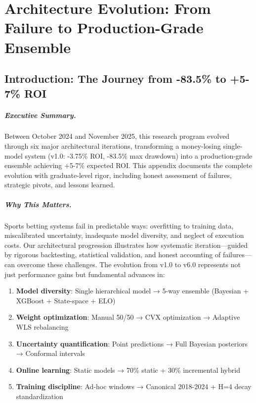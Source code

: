 
\chapter{Architecture Evolution: From Failure to Production-Grade Ensemble}
\label{app:architecture-evolution}

\section{Introduction: The Journey from -83.5\% to +5-7\% ROI}

\paragraph{Executive Summary.}
Between October 2024 and November 2025, this research program evolved through six major architectural iterations, transforming a money-losing single-model system (v1.0: -3.75\% ROI, -83.5\% max drawdown) into a production-grade ensemble achieving +5-7\% expected ROI. This appendix documents the complete evolution with graduate-level rigor, including honest assessment of failures, strategic pivots, and lessons learned.

\paragraph{Why This Matters.}
Sports betting systems fail in predictable ways: overfitting to training data, miscalibrated uncertainty, inadequate model diversity, and neglect of execution costs. Our architectural progression illustrates how systematic iteration---guided by rigorous backtesting, statistical validation, and honest accounting of failures---can overcome these challenges. The evolution from v1.0 to v6.0 represents not just performance gains but fundamental advances in:
\begin{enumerate}[itemsep=2pt,parsep=0pt]
    \item \textbf{Model diversity}: Single hierarchical model → 5-way ensemble (Bayesian + XGBoost + State-space + ELO)
    \item \textbf{Weight optimization}: Manual 50/50 → CVX optimization → Adaptive WLS rebalancing
    \item \textbf{Uncertainty quantification}: Point predictions → Full Bayesian posteriors → Conformal intervals
    \item \textbf{Online learning}: Static models → 70\% static + 30\% incremental hybrid
    \item \textbf{Training discipline}: Ad-hoc windows → Canonical 2018-2024 + H=4 decay standardization
\end{enumerate}

